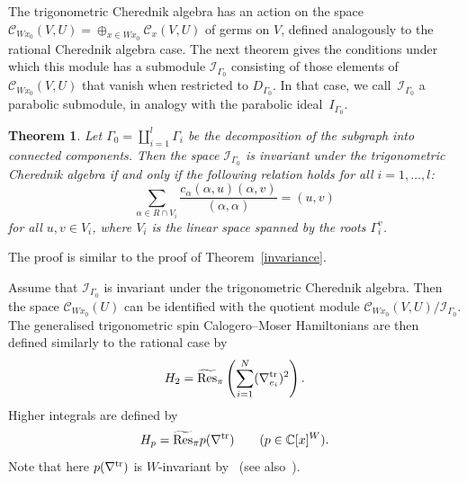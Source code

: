 \documentclass[12pt]{amsart}
\DeclareMathOperator{\Res}{Res}
\numberwithin{equation}{section}
\newtheorem{theorem}{Theorem}[section]
\theoremstyle{definition}
\begin{document}
The trigonometric Cherednik algebra has an action on the space $\mathcal{C}_{Wx_0}(V, U) = \oplus_{x \in Wx_0} \mathcal{C}_{x}(V, U)$ of germs on $V$, defined analogously to the rational Cherednik algebra case. The next theorem gives the conditions under which
this module has a submodule $\mathcal{I}_{\Gamma_0}$ consisting of those elements of $\mathcal{C}_{Wx_0}(V, U)$ that vanish when restricted to $D_{\Gamma_0}$.
In that case, we call~$\mathcal{I}_{\Gamma_0}$ a parabolic submodule, in analogy with the parabolic ideal~$I_{\Gamma_0}$.


\begin{theorem} 
    Let $\Gamma_0 = \coprod_{i = 1}^l \Gamma_i$ be the decomposition
    of the subgraph into connected components. Then the space $\mathcal{I}_{\Gamma_0}$ is invariant under the trigonometric Cherednik algebra if and only if the following relation holds for all $i=1, \dots, l$:
    \begin{equation*}
        \sum\limits_{\alpha \in R \cap V_i} \frac{c_{\alpha} (\alpha , u) (\alpha, v)}{(\alpha, \alpha)} = (u, v)
    \end{equation*}
    for all $u,v \in V_i$, where $V_i$ is the linear space spanned by the roots $\Gamma_i^v$.
\end{theorem}

The proof is similar to the proof of Theorem~\ref{invariance}. 


Assume that $\mathcal{I}_{\Gamma_0}$ is invariant under the trigonometric Cherednik algebra. Then the space $\mathcal{C}_{W x_0}(U)$ can be identified with the quotient module $\mathcal{C}_{W x_0}(V, U) / \mathcal{I}_{\Gamma_0}$. 
The generalised trigonometric spin Calogero--Moser Hamiltonians are then defined similarly to the rational case by
\begin{equation*}
    H_2 = \widetilde{\Res}_\pi\left(\sum\limits_{i=1}^N (\nabla^{\rm tr}_{e_i})^2\right).
\end{equation*} 
Higher integrals are defined by
\begin{equation}
\label{trighigherham}
    H_p = \widetilde{\rm Res}_{\pi} p(\nabla^{\rm tr}) \qquad 
    (p \in \mathbb{C}[x]^{W}).
\end{equation}
Note that here $p(\nabla^{\rm tr})$ is $W$-invariant by~\cite{Ch2} (see also~\cite{HeckmanSurvey}).
\end{document}
